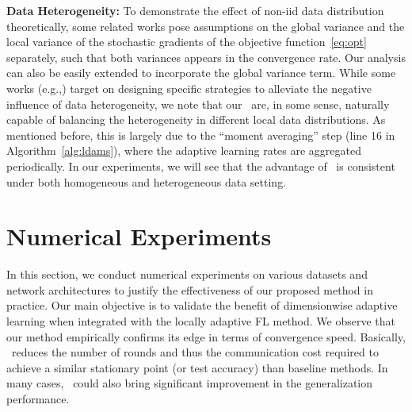 \documentclass[twoside]{article}
\begin{document}
\medskip
\textbf{Data Heterogeneity:} To demonstrate the effect of non-iid data distribution theoretically, some related works pose assumptions on the global variance and the local variance of the stochastic gradients of the objective function~\eqref{eq:opt} separately, such that both variances appears in the convergence rate. Our analysis can also be easily extended to incorporate the global variance term. While some works (e.g.,\citet{karimireddy2019scaffold}) target on designing specific strategies to alleviate the negative influence of data heterogeneity, we note that our \algo\ are, in some sense, naturally capable of balancing the heterogeneity in different local data distributions. As mentioned before, this is largely due to the ``moment averaging'' step (line 16 in Algorithm~\ref{alg:ldams}), where the adaptive learning rates are aggregated periodically. In our experiments, we will see that the advantage of \algo\ is consistent under both homogeneous and heterogeneous data setting. 





\section{Numerical Experiments}\label{sec:numerical}

In this section, we conduct numerical experiments on various datasets and network architectures to justify the effectiveness of our proposed method in practice. Our main objective is to validate the benefit of dimensionwise adaptive learning when integrated with the locally adaptive FL method.
We observe that our method empirically confirms its edge in terms of convergence speed.
Basically, \algo\ reduces the number of rounds and thus the communication cost required to achieve a similar stationary point (or test accuracy) than baseline methods. In many cases, \algo\ could also bring significant improvement in the generalization performance.
\end{document}
